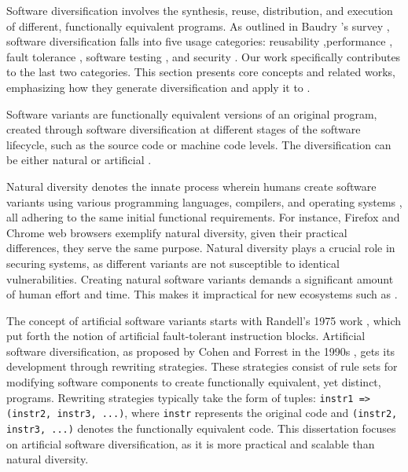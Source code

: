 

\label{sota:sw}

Software diversification involves the synthesis, reuse, distribution, and execution of different, functionally equivalent programs. 
As outlined in Baudry \etal's survey \cite{natural_diversity}, software diversification falls into five usage categories: reusability \cite{pohl2005software},performance \cite{10.1145/2025113.2025133}, fault tolerance \cite{1659219}, software testing \cite{Chen2010AdaptiveRT}, and security \cite{cohen1993operating}. 
Our work specifically contributes to the last two categories.
This section presents core concepts and related works, emphasizing how they generate diversification and apply it to \Wasm.



\label{generation}

Software variants are functionally equivalent versions of an original program, created through software diversification at different stages of the software lifecycle, such as the source code or machine code levels. 
The diversification can be either natural \cite{natural_diversity} or artificial \cite{offensive_div}.

\begin{strategy}
    \label{natural_diversity}
    Natural diversity denotes the innate process wherein humans create software variants using various programming languages, compilers, and operating systems \cite{natural_diversity}, all adhering to the same initial functional requirements.
    For instance, Firefox and Chrome web browsers exemplify natural diversity, given their practical differences, they serve the same purpose.
    Natural diversity plays a crucial role in securing systems, as different variants are not susceptible to identical vulnerabilities.
    Creating natural software variants demands a significant amount of human effort and time. 
    This makes it impractical for new ecosystems such as \Wasm.
\end{strategy}


\begin{strategy}
    \label{artificial_diversity}
    The concept of artificial software variants starts with Randell's 1975 work \cite{10.1145/390016.808467}, which put forth the notion of artificial fault-tolerant instruction blocks. 
    Artificial software diversification, as proposed by Cohen and Forrest in the 1990s \cite{cohen1993operating, 595185}, gets its development through rewriting strategies. 
    These strategies consist of rule sets for modifying software components to create functionally equivalent, yet distinct, programs. 
    Rewriting strategies typically take the form of tuples: \texttt{instr1 => (instr2, instr3, ...)}, where \texttt{instr} represents the original code and \texttt{(instr2, instr3, ...)} denotes the functionally equivalent code.
    This dissertation focuses on artificial software diversification, as it is more practical and scalable than natural diversity.
\end{strategy}

